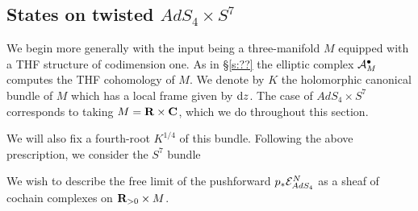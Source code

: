 \documentclass[../main.tex]{subfiles}
\begin{document}

\subsection{States on twisted $AdS_4\times S^7$}\label{s:ads4states}
We begin more generally with the input being a three-manifold $M$ equipped with a THF structure of codimension one.
As in \S \ref{s:??} the elliptic complex $\mathcal A^\bullet_M$ computes the THF cohomology of $M$.
We denote by $K$ the holomorphic canonical bundle of $M$ which has a local frame given by $\mathrm{d} z$.
The case of $AdS_4 \times S^7$ corresponds to taking $M = \mathbf{R} \times \mathbf{C}$, which we do throughout this section.

We will also fix a fourth-root $K^{1/4}$ of this bundle.
Following the above prescription, we consider the $S^7$ bundle 
\beqn\label{eqn:geomads4}
\eeqn
We wish to describe the free limit of the pushforward $p_* \mathcal{E}^N_{AdS_4}$ as a sheaf of cochain complexes on $\mathbf{R}_{>0}\times M$. 
\end{document}
